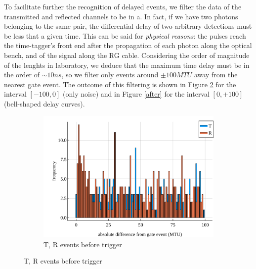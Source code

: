 \documentclass[10pt, final]{article}
\begin{document}
\begin{multicols}{2}
To facilitate further the recognition of delayed events, we filter the data of the transmitted and reflected channels to be in a.
In fact, if we have two photons belonging to the same pair, the differential delay of two arbitrary detections must be less that a given time. This can be said for \emph{physical reasons}: the pulses reach the time-tagger's front end after the propagation of each photon along the optical bench, and of the signal along the RG cable. Considering the order of magnitude of the lenghts in laboratory, we deduce that the maximum time delay must be in the order of $\sim 10 ns$, so we filter only events around $\pm 100 MTU$ away from the nearest gate event. The outcome of this filtering is shown in Figure \ref{before} for the interval $[-100, 0]$ (only noise) and in Figure \ref{after} for the interval $[0, +100]$ (bell-shaped delay curves).
\begin{mdframed}
    \begin{figure}[H]
        \begin{subfigure}{\textwidth}
            \centering
            \includegraphics[width = \textwidth]{../images/before.pdf}
            \caption{T, R events before trigger}
            \label{before}
        \end{subfigure}


\end{figure}
\end{mdframed}
\end{multicols}
\end{document}
